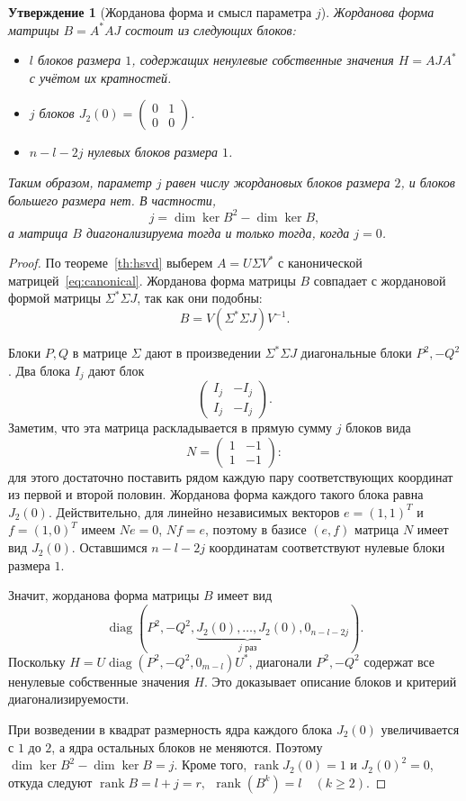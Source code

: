 \documentclass[a4paper,12pt]{article}
\DeclareMathOperator{\rank}{rank}
\DeclareMathOperator{\diag}{diag}
\theoremstyle{csstyle}
\newtheorem{proposition}[theorem]{Утверждение}
\begin{document}
\begin{proposition}[Жорданова форма и смысл параметра $j$]
\label{rev:cor-jordan-full}
Жорданова форма матрицы $B=A^*AJ$ состоит из следующих блоков:
\begin{itemize}
\item $l$ блоков размера $1$, содержащих ненулевые собственные
значения $H=AJA^*$ с учётом их кратностей.
\item $j$ блоков $J_2(0)=\begin{pmatrix}0&1\\0&0\end{pmatrix}$.
\item $n-l-2j$ нулевых блоков размера $1$.
\end{itemize}
Таким образом, параметр $j$ равен числу жордановых блоков размера $2$,
и блоков большего размера нет. В частности,
\[
j=\dim\ker B^2-\dim\ker B,
\]
а матрица $B$ диагонализируема тогда и только тогда, когда $j=0$.
\end{proposition}
\begin{proof}
По теореме~\ref{th:hsvd} выберем $A=U\Sigma V^*$
с канонической матрицей~\eqref{eq:canonical}.
Жорданова форма матрицы $B$ совпадает с жордановой формой матрицы
$\Sigma^*\Sigma J$, так как они подобны:
\[
B=V(\Sigma^*\Sigma J)V^{-1}.
\]

Блоки $P,Q$ в матрице $\Sigma$ дают в произведении
$\Sigma^*\Sigma J$ диагональные блоки $P^2,-Q^2$.
Два блока $I_j$ дают блок
\[
\begin{pmatrix}I_j&-I_j\\I_j&-I_j\end{pmatrix}.
\]
Заметим, что эта матрица раскладывается в прямую сумму $j$ блоков вида
\[
N=\begin{pmatrix}1&-1\\1&-1\end{pmatrix}:
\]
для этого достаточно поставить рядом каждую пару соответствующих
координат из первой и второй половин.
Жорданова форма каждого такого блока равна $J_2(0)$.
Действительно, для линейно независимых векторов
$e=(1,1)^T$ и $f=(1,0)^T$ имеем $Ne=0$, $Nf=e$,
поэтому в базисе $(e,f)$ матрица $N$ имеет вид $J_2(0)$.
Оставшимся $n-l-2j$ координатам соответствуют нулевые блоки размера $1$.

Значит, жорданова форма матрицы $B$ имеет вид
\[
\diag\left(P^2,-Q^2,
\underbrace{J_2(0),\ldots,J_2(0)}_{j\text{ раз}},
0_{n-l-2j}\right).
\]
Поскольку $H=U\diag(P^2,-Q^2,0_{m-l})U^*$,
диагонали $P^2,-Q^2$ содержат все ненулевые собственные значения $H$.
Это доказывает описание блоков и критерий диагонализируемости.

При возведении в квадрат размерность ядра каждого блока $J_2(0)$ увеличивается
с $1$ до $2$, а ядра остальных блоков не меняются.
Поэтому $\dim\ker B^2-\dim\ker B=j$.
Кроме того, $\rank J_2(0)=1$ и $J_2(0)^2=0$, откуда следуют
$\rank B=l+j=r,\ \ \rank(B^k)=l\quad(k\ge2)$.
\end{proof}
\end{document}
